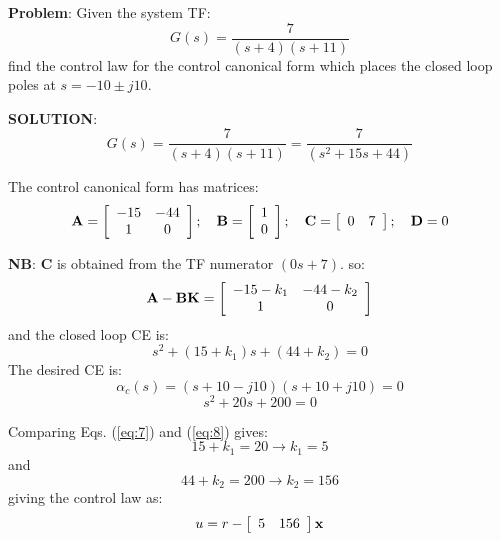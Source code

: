 \textbf{Problem}: Given the system TF:
\[
G(s) = \frac{7}{(s+4)(s+11)}
\]
find the control law for the control canonical form which places the closed loop poles at $s=−10\pm j10$.

\textbf{SOLUTION}:
\[
G(s) = \frac{7}{(s+4)(s+11)} = \frac{7}{(s^2+15s+44)}
\]
 
The control canonical form has matrices:
\[
{\bf{A}} = \left[ {\begin{array}{*{20}c}
   { - 15} & { - 44}  \\
   1 & 0  \\
\end{array}} \right];\quad {\bf{B}} = \left[ {\begin{array}{*{20}c}
   1  \\
   0  \\
\end{array}} \right];\quad {\bf{C}} = \left[ {\begin{array}{*{20}c}
   0 & 7  \\
\end{array}} \right];\quad {\bf{D}} = 0
\]
 
\textbf{NB}:  $\mathbf{C}$ is obtained from the TF numerator $(0s+7)$.
so:    
\[
{\bf{A}} - {\bf{BK}} = \left[ {\begin{array}{*{20}c}
   { - 15 - k_1 } & { - 44 - k_2 }  \\
   1 & 0  \\
\end{array}} \right]
\]
and the closed loop CE is:
\begin{equation}
	s^2+(15+k_1)s+(44+k_2)=0 \label{eq:7}
\end{equation}
The desired CE is:
\[
\alpha_c(s)=(s+10-j10)(s+10+j10) = 0
\]
\begin{equation}\label{eq:8}
	s^2+20s+200=0
\end{equation}
 
Comparing Eqs. (\ref{eq:7})  and  (\ref{eq:8}) gives:
\[
15 + k_1  = 20 \to k_1  = 5
\]
and
\[
44 + k_2  = 200 \to k_2  = 156
\]
giving the control law as:   
\[
u = r - \left[ {\begin{array}{*{20}c}
   {5} & {156}  \\
\end{array}} \right]{\bf{x}}
\]

